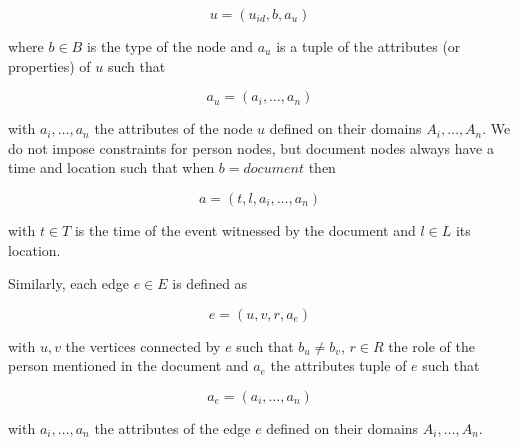 \begin{equation}
    u = (u_{id}, b, a_u)
\end{equation}

where $b \in B$ is the type of the node and $a_u$ is a tuple of the attributes (or properties) of $u$ such that

\begin{equation}
    a_u = (a_i, \dotsc, a_n)
\end{equation}

with $a_i, \dotsc, a_n$ the attributes of the node $u$ defined on their domains $A_i, \dotsc, A_n$.
We do not impose constraints for person nodes, but document nodes always have a time and location such that when $b = document$ then

\begin{equation}
    a = (t, l, a_i, \dotsc, a_n)
\end{equation}

with $t \in T$ is the time of the event witnessed by the document and $l \in L$ its location.

Similarly, each edge $e \in E$ is defined as

\begin{equation}
    e = (u, v, r, a_e)
\end{equation}

with $u, v$ the vertices connected by $e$ such that $b_u \neq b_v$, $r \in R$ the role of the person mentioned in the document and $a_e$ the attributes tuple of $e$ such that

\begin{equation}
    a_e = (a_i, \dotsc, a_n)
\end{equation}

with $a_i, \dotsc, a_n$ the attributes of the edge $e$ defined on their domains $A_i, \dotsc, A_n$.


